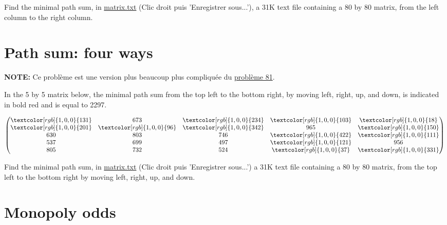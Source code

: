 Find the minimal path sum, in \href{https://projecteuler.net/project/resources/p082_matrix.txt}{matrix.txt} (Clic droit puis 'Enregistrer sous...'), a 31K text file containing a 80 by 80 matrix, from the left column to the right column.

\section{Path sum: four ways} \label{pb.083}

\textbf{NOTE:} Ce problème est une version plus beaucoup plus compliquée du  \hyperref[pb.081]{problème 81}.

In the 5 by 5 matrix below, the minimal path sum from the top left to the bottom right, by moving left, right, up, and down, is indicated in bold red and is equal to 2297.

$$\begin{pmatrix}
    \textcolor[rgb]{1,0,0}{131} & 673 & \textcolor[rgb]{1,0,0}{234} & \textcolor[rgb]{1,0,0}{103} & \textcolor[rgb]{1,0,0}{18} \\
    \textcolor[rgb]{1,0,0}{201} & \textcolor[rgb]{1,0,0}{96} & \textcolor[rgb]{1,0,0}{342} & 965 & \textcolor[rgb]{1,0,0}{150} \\
    630 & 803 & 746 & \textcolor[rgb]{1,0,0}{422} & \textcolor[rgb]{1,0,0}{111}\\
    537 & 699 & 497 & \textcolor[rgb]{1,0,0}{121} & 956\\
    805 & 732 & 524 & \textcolor[rgb]{1,0,0}{37} & \textcolor[rgb]{1,0,0}{331}\\
\end{pmatrix}$$

Find the minimal path sum, in \href{https://projecteuler.net/project/resources/p083_matrix.txt}{matrix.txt} (Clic droit puis 'Enregistrer sous...') a 31K text file containing a 80 by 80 matrix, from the top left to the bottom right by moving left, right, up, and down.

\section{Monopoly odds} \label{pb.084}

